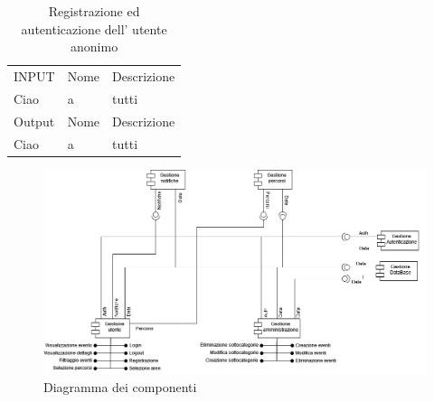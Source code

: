 \documentclass{article}
\begin{document}
\begin{table}[htbp]
    \centering
    \begin{tabularx}{\textwidth}{| l | l | p{} |}
        \Xhline{2pt}
        INPUT & Nome & Descrizione \\
        \Xhline{2pt}
        Ciao & a & tutti \\
        \Xhline{2pt}
        Output & Nome & Descrizione \\
        \Xhline{2pt}
        Ciao & a & tutti \\
        \hline
    \end{tabularx}
    \caption{Registrazione ed autenticazione dell' utente anonimo}
\end{table}

\begin{figure}[htbp]
    \centering
    \includegraphics[width=1\textwidth]{Images/ComponentDiagram.png}
    \caption{Diagramma dei componenti}
    \label{fig:component-diagram}
\end{figure}
\end{document}
